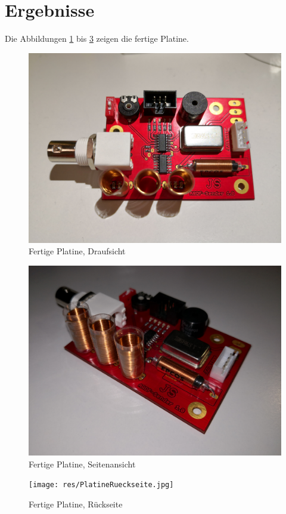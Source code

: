 \section{Ergebnisse}
Die Abbildungen \ref{bild1} bis \ref{bild3} zeigen die fertige Platine. 
\begin{figure}[H]\centering
	\includegraphics[width=16cm]{res/PlatineDraufsicht.jpg}
	\caption{Fertige Platine, Draufsicht}
	\label{bild1}
\end{figure}
\begin{figure}[H]\centering
	\includegraphics[width=16cm]{res/PlatineSeite.jpg}
	\caption{Fertige Platine, Seitenansicht}
	\label{bild2}
\end{figure}
\begin{figure}[H]\centering
	\texttt{[image: res/PlatineRueckseite.jpg]}
	\caption{Fertige Platine, Rückseite}
	\label{bild3}
\end{figure}
